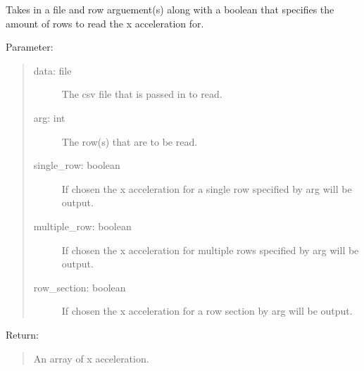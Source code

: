 \documentclass[letterpaper,10pt,english]{sphinxmanual}
\begin{document}
\begin{fulllineitems}
\label{\detokenize{Lidar extraction tool:imu_extract.get_x_accel}}
Takes in a file and row arguement(s) along with a boolean that specifies the amount of rows to read the x acceleration for.

Parameter:
\begin{quote}
\begin{description}
\item[{data: file}] \leavevmode
The csv file that is passed in to read.

\item[{arg: int}] \leavevmode
The row(s) that are to be read.

\item[{single\_row: boolean}] \leavevmode
If chosen the x acceleration for a single row specified by arg will be output.

\item[{multiple\_row: boolean}] \leavevmode
If chosen the x acceleration for multiple rows specified by arg will be output.

\item[{row\_section: boolean}] \leavevmode
If chosen the x acceleration for a row section by arg will be output.

\end{description}
\end{quote}

Return:
\begin{quote}

An array of x acceleration.
\end{quote}

\end{fulllineitems}

\end{document}
